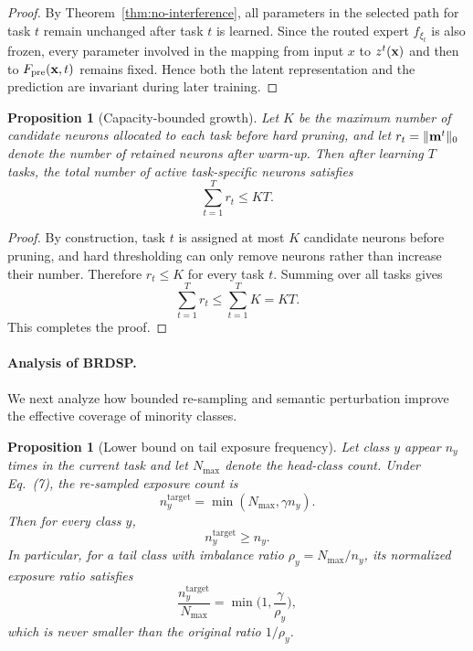 \documentclass[journal]{IEEEtran}
\theoremstyle{plain}
\newtheorem{proposition}[theorem]{Proposition}
\theoremstyle{definition}
\theoremstyle{remark}
\begin{document}
\begin{proof}
By Theorem~\ref{thm:no-interference}, all parameters in the selected path for task $t$ remain unchanged after task $t$ is learned. Since the routed expert $f_{\xi_t}$ is also frozen, every parameter involved in the mapping from input $x$ to $z^t({\bf x})$ and then to $F_{\mathrm{pre}}({\bf x},t)$ remains fixed. Hence both the latent representation and the prediction are invariant during later training.
\end{proof}

\begin{proposition}[Capacity-bounded growth]
\label{prop:capacity-bound}
Let $K$ be the maximum number of candidate neurons allocated to each task before hard pruning, and let $r_t=\|{\bf m}^t\|_0$ denote the number of retained neurons after warm-up. Then after learning $T$ tasks, the total number of active task-specific neurons satisfies
\begin{equation}
\sum_{t=1}^{T} r_t \le KT.
\label{eq:capacity-bound}
\end{equation}
\end{proposition}

\begin{proof}
By construction, task $t$ is assigned at most $K$ candidate neurons before pruning, and hard thresholding can only remove neurons rather than increase their number. Therefore $r_t\le K$ for every task $t$. Summing over all tasks gives
\begin{equation}
\sum_{t=1}^{T} r_t \le \sum_{t=1}^{T} K = KT.
\end{equation}
This completes the proof.
\end{proof}

\paragraph{Analysis of BRDSP.}
We next analyze how bounded re-sampling and semantic perturbation improve the effective coverage of minority classes.

\begin{proposition}[Lower bound on tail exposure frequency]
\label{prop:tail-exposure}
Let class $y$ appear $n_y$ times in the current task and let $N_{\max}$ denote the head-class count. Under Eq.~(7), the re-sampled exposure count is
\begin{equation}
n_y^{\mathrm{target}}=\min(N_{\max},\gamma n_y).
\end{equation}
Then for every class $y$,
\begin{equation}
n_y^{\mathrm{target}}\ge n_y.
\label{eq:exposure-lower-bound}
\end{equation}
In particular, for a tail class with imbalance ratio $\rho_y=N_{\max}/n_y$, its normalized exposure ratio satisfies
\begin{equation}
\frac{n_y^{\mathrm{target}}}{N_{\max}}=\min\Big(1,\frac{\gamma}{\rho_y}\Big),
\label{eq:normalized-exposure}
\end{equation}
which is never smaller than the original ratio $1/\rho_y$.
\end{proposition}
\end{document}
